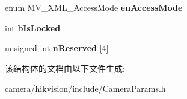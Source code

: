 \begin{DoxyCompactItemize}
\mbox{\label{struct___m_v___x_m_l___f_e_a_t_u_r_e___port___ad5afc0f43c1790720d3f2d1d21087731}} 
enum M\+V\+\_\+\+X\+M\+L\+\_\+\+Access\+Mode {\bfseries en\+Access\+Mode}
\item 
\mbox{\label{struct___m_v___x_m_l___f_e_a_t_u_r_e___port___a0899cc485fe31d0190b4b5fec402a377}} 
int {\bfseries b\+Is\+Locked}
\item 
\mbox{\label{struct___m_v___x_m_l___f_e_a_t_u_r_e___port___a42009d003d89cf2b63108b9fa48feb82}} 
unsigned int {\bfseries n\+Reserved} \mbox{[}4\mbox{]}
\end{DoxyCompactItemize}


该结构体的文档由以下文件生成\+:\begin{DoxyCompactItemize}
\item 
camera/hikvision/include/Camera\+Params.\+h\end{DoxyCompactItemize}
